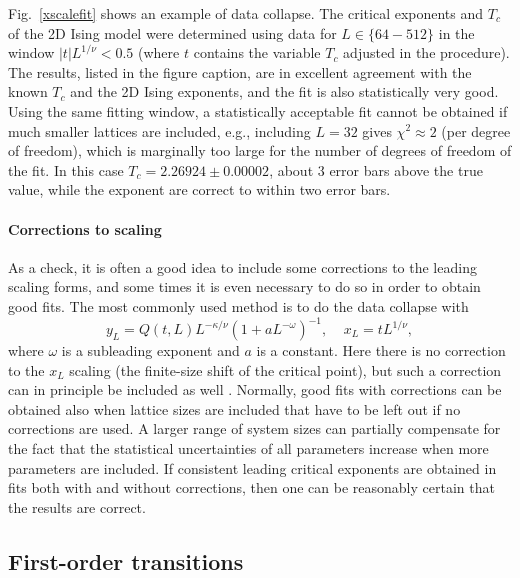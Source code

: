 \documentclass[draft,numberedheadings]{aipproc}
\begin{document}
Fig.~\ref{xscalefit} shows an example of data collapse. The critical exponents and $T_c$ of the 2D Ising model were determined using data for 
$L \in \{64-512\}$ in the window $|t|L^{1/\nu}<0.5$ (where $t$ contains the variable $T_c$ adjusted in the procedure). The results,
listed in the figure caption, are in excellent agreement with the known $T_c$ and the 2D Ising exponents, and the fit is also statistically very good. Using the 
same fitting window, a statistically acceptable fit cannot be obtained if much smaller lattices are included, e.g., including $L=32$ gives $\chi^2\approx 2$ 
(per degree of freedom), which is marginally too large for the number of degrees of freedom of the fit. In this case $T_c=2.26924 \pm  0.00002$, about 3 error 
bars above the true value, while the exponent are correct to within two error bars.

\paragraph{Corrections to scaling }

As a check, it is often a good idea to include some corrections to the leading scaling forms, and some times it is even necessary to do so in order to obtain 
good fits. The most commonly used method is to do the data collapse with 
\begin{equation}
y_L=Q(t,L)L^{-\kappa/\nu}(1+aL^{-\omega})^{-1},~~~~~x_L=tL^{1/\nu},
\end{equation}
where $\omega$ is a subleading exponent and $a$ is a constant. Here there is no correction to the $x_L$ scaling (the finite-size shift of the critical point), but 
such a correction can in principle be included as well \cite{wang}. Normally, good fits with corrections can be obtained also when lattice sizes are included that 
have to be left out if no corrections are used. A larger range of system sizes can partially compensate for the fact that the statistical uncertainties of all 
parameters increase when more parameters are included. If consistent leading critical exponents are obtained in fits both with and without corrections, 
then one can be reasonably certain that the results are correct. 

\subsection{First-order transitions}
\label{firstordertrans}
\end{document}

